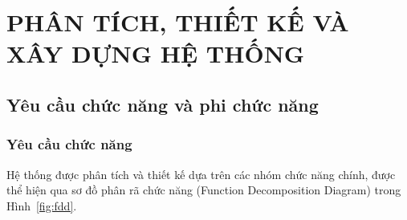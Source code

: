 


\chapter{PHÂN TÍCH, THIẾT KẾ VÀ XÂY DỰNG HỆ THỐNG}

\section{Yêu cầu chức năng và phi chức năng}

\subsection{Yêu cầu chức năng}

Hệ thống được phân tích và thiết kế dựa trên các nhóm chức năng chính, 
được thể hiện qua sơ đồ phân rã chức năng (Function Decomposition Diagram) 
trong Hình~\ref{fig:fdd}.


